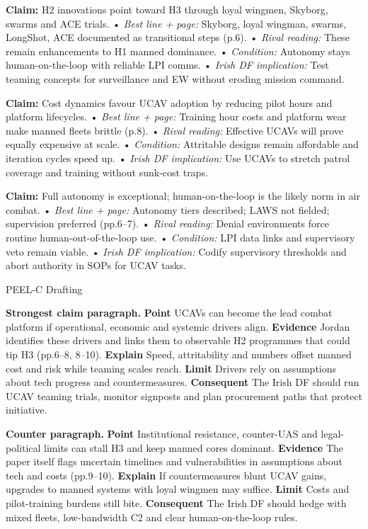 \textbf{Claim:} H2 innovations point toward H3 through loyal wingmen, Skyborg, swarms and ACE trials.
• \emph{Best line + page:} Skyborg, loyal wingman, swarms, LongShot, ACE documented as transitional steps (p.6).
• \emph{Rival reading:} These remain enhancements to H1 manned dominance.
• \emph{Condition:} Autonomy stays human-on-the-loop with reliable LPI comms.
• \emph{Irish DF implication:} Test teaming concepts for surveillance and EW without eroding mission command.

\textbf{Claim:} Cost dynamics favour UCAV adoption by reducing pilot hours and platform lifecycles.
• \emph{Best line + page:} Training hour costs and platform wear make manned fleets brittle (p.8).
• \emph{Rival reading:} Effective UCAVs will prove equally expensive at scale.
• \emph{Condition:} Attritable designs remain affordable and iteration cycles speed up.
• \emph{Irish DF implication:} Use UCAVs to stretch patrol coverage and training without sunk-cost traps.

\textbf{Claim:} Full autonomy is exceptional; human-on-the-loop is the likely norm in air combat.
• \emph{Best line + page:} Autonomy tiers described; LAWS not fielded; supervision preferred (pp.6–7).
• \emph{Rival reading:} Denial environments force routine human-out-of-the-loop use.
• \emph{Condition:} LPI data links and supervisory veto remain viable.
• \emph{Irish DF implication:} Codify supervisory thresholds and abort authority in SOPs for UCAV tasks.

PEEL-C Drafting

\textbf{Strongest claim paragraph.}
\textbf{Point} UCAVs can become the lead combat platform if operational, economic and systemic drivers align.
\textbf{Evidence} Jordan identifies these drivers and links them to observable H2 programmes that could tip H3 (pp.6–8, 8–10).
\textbf{Explain} Speed, attritability and numbers offset manned cost and risk while teaming scales reach.
\textbf{Limit} Drivers rely on assumptions about tech progress and countermeasures. \textbf{Consequent} The Irish DF should run UCAV teaming trials, monitor signposts and plan procurement paths that protect initiative.

\textbf{Counter paragraph.}
\textbf{Point} Institutional resistance, counter-UAS and legal-political limits can stall H3 and keep manned cores dominant.
\textbf{Evidence} The paper itself flags uncertain timelines and vulnerabilities in assumptions about tech and costs (pp.9–10).
\textbf{Explain} If countermeasures blunt UCAV gains, upgrades to manned systems with loyal wingmen may suffice.
\textbf{Limit} Costs and pilot-training burdens still bite. \textbf{Consequent} The Irish DF should hedge with mixed fleets, low-bandwidth C2 and clear human-on-the-loop rules.

